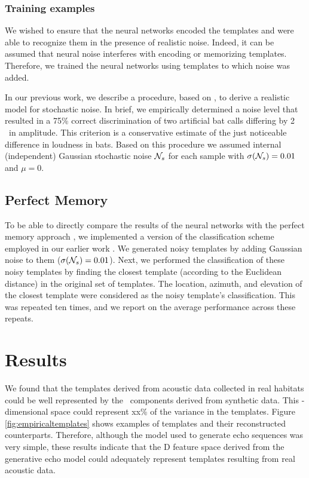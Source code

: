 \documentclass[preprint,5p]{elsarticle}
\begin{document}
\subsubsection{Training examples}

We wished to ensure that the neural networks encoded the templates and were able to recognize them in the presence of realistic noise. Indeed, it can be assumed that neural noise interferes with encoding or memorizing templates. Therefore, we trained the neural networks using templates to which noise was added.

In our previous work, we describe a procedure, based on \citet{Dau1996}, to derive a realistic model for stochastic noise. In brief, we empirically determined a noise level that resulted in a 75\% correct discrimination of two artificial bat calls differing by 2 \db\ in amplitude. This criterion is a conservative estimate of the just noticeable difference in loudness in bats. Based on this procedure we assumed internal (independent) Gaussian stochastic noise $\mathcal{N}_s$ for each sample with $\sigma(\mathcal{N}_s) = 0.01$ and $\mu=0$.

\subsection{Perfect Memory}

To be able to directly compare the results of the neural networks with the perfect memory approach \citep{Baddeley2012}, we implemented a version of the classification scheme employed in our earlier work \citep{Vanderelst2016}. We generated noisy templates by adding Gaussian noise to them ($\sigma(\mathcal{N}_s) = 0.01$). Next, we performed the classification of these noisy templates by finding the closest template (according to the Euclidean distance) in the original set of templates. The location, azimuth, and elevation of the closest template were considered as the noisy template's classification. This was repeated ten times, and we report on the average performance across these repeats.

\section{Results}

We found that the templates derived from acoustic data collected in real habitats could be well represented by the \pca\ components derived from synthetic data. This \pca-dimensional space could represent xx\% of the variance in the templates. Figure \ref{fig:empiricaltemplates} shows examples of templates and their reconstructed counterparts. Therefore, although the model used to generate echo sequences was very simple, these results indicate that the \pca D feature space derived from the generative echo model could adequately represent templates resulting from real acoustic data.
\end{document}
